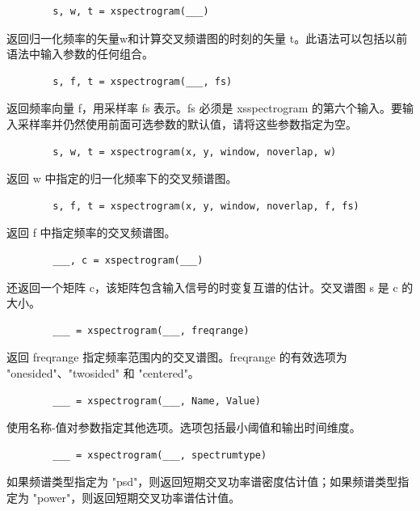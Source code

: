 \documentclass{article}
\begin{document}
	\begin{verbatim}
		s, w, t = xspectrogram(___)
	\end{verbatim}
	
	返回归一化频率的矢量w和计算交叉频谱图的时刻的矢量 t。此语法可以包括以前语法中输入参数的任何组合。
	
	\begin{verbatim}
		s, f, t = xspectrogram(___, fs)
	\end{verbatim}
	
	返回频率向量 f，用采样率 fs 表示。fs 必须是 xsspectrogram 的第六个输入。要输入采样率并仍然使用前面可选参数的默认值，请将这些参数指定为空。
	
	\begin{verbatim}
		s, w, t = xspectrogram(x, y, window, noverlap, w)
	\end{verbatim}
	
	返回 w 中指定的归一化频率下的交叉频谱图。
	
	\begin{verbatim}
		s, f, t = xspectrogram(x, y, window, noverlap, f, fs)
	\end{verbatim}
	
	返回 f 中指定频率的交叉频谱图。
	
	\begin{verbatim}
		___, c = xspectrogram(___)
	\end{verbatim}
	
	还返回一个矩阵 c，该矩阵包含输入信号的时变复互谱的估计。交叉谱图 s 是 c 的大小。
	
	\begin{verbatim}
		___ = xspectrogram(___, freqrange)
	\end{verbatim}
	
	返回 freqrange 指定频率范围内的交叉谱图。freqrange 的有效选项为 "onesided"、"twosided" 和 "centered"。
	
	\begin{verbatim}
		___ = xspectrogram(___, Name, Value)
	\end{verbatim}
	
	使用名称-值对参数指定其他选项。选项包括最小阈值和输出时间维度。
	
	\begin{verbatim}
		___ = xspectrogram(___, spectrumtype)
	\end{verbatim}
	
	如果频谱类型指定为 "psd"，则返回短期交叉功率谱密度估计值；如果频谱类型指定为 "power"，则返回短期交叉功率谱估计值。
	
\end{document}
